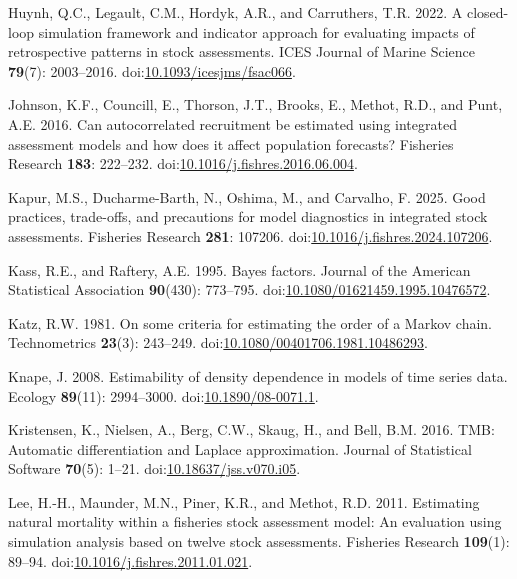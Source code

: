 \documentclass[
  12pt,
]{article}
\newlength{\cslhangindent}
\newenvironment{CSLReferences}[2] %
 {\begin{list}{}{%
  \setlength{\itemindent}{0pt}
  \setlength{\leftmargin}{0pt}
  \setlength{\parsep}{0pt}
  \ifodd #1
   \setlength{\leftmargin}{\cslhangindent}
   \setlength{\itemindent}{-1\cslhangindent}
  \fi
  \setlength{\itemsep}{#2\baselineskip}}}
 {\end{list}}
\begin{document}
\begin{CSLReferences}{1}{0}
Huynh, Q.C., Legault, C.M., Hordyk, A.R., and Carruthers, T.R. 2022. A
closed-loop simulation framework and indicator approach for evaluating
impacts of retrospective patterns in stock assessments. ICES Journal of
Marine Science \textbf{79}(7): 2003--2016.
doi:\href{https://doi.org/10.1093/icesjms/fsac066}{10.1093/icesjms/fsac066}.

Johnson, K.F., Councill, E., Thorson, J.T., Brooks, E., Methot, R.D.,
and Punt, A.E. 2016. Can autocorrelated recruitment be estimated using
integrated assessment models and how does it affect population
forecasts? Fisheries Research \textbf{183}: 222--232.
doi:\href{https://doi.org/10.1016/j.fishres.2016.06.004}{10.1016/j.fishres.2016.06.004}.

Kapur, M.S., Ducharme-Barth, N., Oshima, M., and Carvalho, F. 2025. Good
practices, trade-offs, and precautions for model diagnostics in
integrated stock assessments. Fisheries Research \textbf{281}: 107206.
doi:\href{https://doi.org/10.1016/j.fishres.2024.107206}{10.1016/j.fishres.2024.107206}.

Kass, R.E., and Raftery, A.E. 1995. Bayes factors. Journal of the
American Statistical Association \textbf{90}(430): 773--795.
doi:\href{https://doi.org/10.1080/01621459.1995.10476572}{10.1080/01621459.1995.10476572}.

Katz, R.W. 1981. On some criteria for estimating the order of a {M}arkov
chain. Technometrics \textbf{23}(3): 243--249.
doi:\href{https://doi.org/10.1080/00401706.1981.10486293}{10.1080/00401706.1981.10486293}.

Knape, J. 2008. Estimability of density dependence in models of time
series data. Ecology \textbf{89}(11): 2994--3000.
doi:\href{https://doi.org/10.1890/08-0071.1}{10.1890/08-0071.1}.

Kristensen, K., Nielsen, A., Berg, C.W., Skaug, H., and Bell, B.M. 2016.
{TMB}: Automatic differentiation and {L}aplace approximation. Journal of
Statistical Software \textbf{70}(5): 1--21.
doi:\href{https://doi.org/10.18637/jss.v070.i05}{10.18637/jss.v070.i05}.

Lee, H.-H., Maunder, M.N., Piner, K.R., and Methot, R.D. 2011.
Estimating natural mortality within a fisheries stock assessment model:
An evaluation using simulation analysis based on twelve stock
assessments. Fisheries Research \textbf{109}(1): 89--94.
doi:\href{https://doi.org/10.1016/j.fishres.2011.01.021}{10.1016/j.fishres.2011.01.021}.


\end{CSLReferences}
\end{document}
